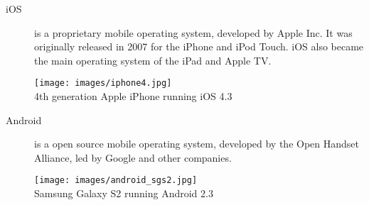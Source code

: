 

\begin{description}
\item[iOS]is a proprietary mobile operating system, developed by Apple Inc. It was originally released in 2007 for the iPhone and iPod Touch. iOS also became the main operating system of the iPad and Apple TV.

\cite{Sylvain2012}

\begin{centering}
\texttt{[image: images/iphone4.jpg]}\\{4th generation Apple iPhone running iOS 4.3}\\
\end{centering}

\item[Android] is a open source mobile operating system, developed by the Open Handset Alliance, led by Google and other companies.\cite{Inc.2012}

\begin{centering}
\texttt{[image: images/android\_sgs2.jpg]}\\{Samsung Galaxy S2 running Android 2.3}\\
\end{centering}









\end{description}